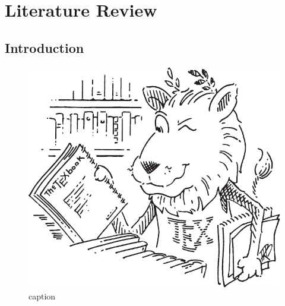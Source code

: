 \chapter{Literature Review}
\label{ch2:LiteratureReview}

\section{Introduction}
\label{ch2:sec:Introduction}

\cite{Gai_2005_LaTeXKeJiWenDangPaiBan,Gai_2006_LaTeXMathematicsCompanion,Ghaffari_2014_PreparingFiguresMatlab,Huang_2013_LeiTaiHePaiBanXiTongJianJieLaTeXNotes,Liu_2013_LaTeXRuMen,Oetiker_2019_YiFenBuTaiJianDuanDeLaTeX2eJieShao,Reckdahl_2017_LaTeX2eChaTuZhiNan}

\begin{figure}[!htb]
  \centering
  \includegraphics[width=0.9\linewidth]{Figures/Chapter2/ctanlion.pdf}
  \caption{caption}\label{fig:fig1}
\end{figure}

